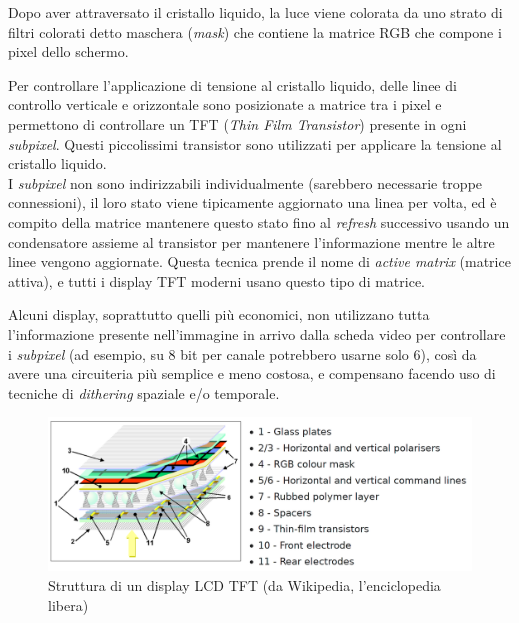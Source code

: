 Dopo aver attraversato il cristallo liquido, la luce viene colorata da uno strato di filtri colorati detto maschera (\textit{mask}) che contiene la matrice RGB che compone i pixel dello schermo.

Per controllare l'applicazione di tensione al cristallo liquido, delle linee di controllo verticale e orizzontale sono posizionate a matrice tra i pixel e permettono di controllare un TFT (\textit{Thin Film Transistor}) presente in ogni \textit{subpixel}. Questi piccolissimi transistor sono utilizzati per applicare la tensione al cristallo liquido.\\
I \textit{subpixel} non sono indirizzabili individualmente (sarebbero necessarie troppe connessioni), il loro stato viene tipicamente aggiornato una linea per volta, ed è compito della matrice mantenere questo stato fino al \textit{refresh} successivo usando un condensatore assieme al transistor per mantenere l'informazione mentre le altre linee vengono aggiornate. Questa tecnica prende il nome di \textit{active matrix} (matrice attiva), e tutti i display TFT moderni usano questo tipo di matrice.

Alcuni display, soprattutto quelli più economici, non utilizzano tutta l'informazione presente nell'immagine in arrivo dalla scheda video per controllare i \textit{subpixel} (ad esempio, su 8 bit per canale potrebbero usarne solo 6), così da avere una circuiteria più semplice e meno costosa, e compensano facendo uso di tecniche di \textit{dithering} spaziale e/o temporale.

\begin{figure}[h]
	\centering
	\includegraphics[width=\textwidth]{Introduzione_files/lcdtft.png}
	\caption{Struttura di un display LCD TFT (da Wikipedia, l'enciclopedia libera)}
	\label{fig:lcdtft}
\end{figure}

